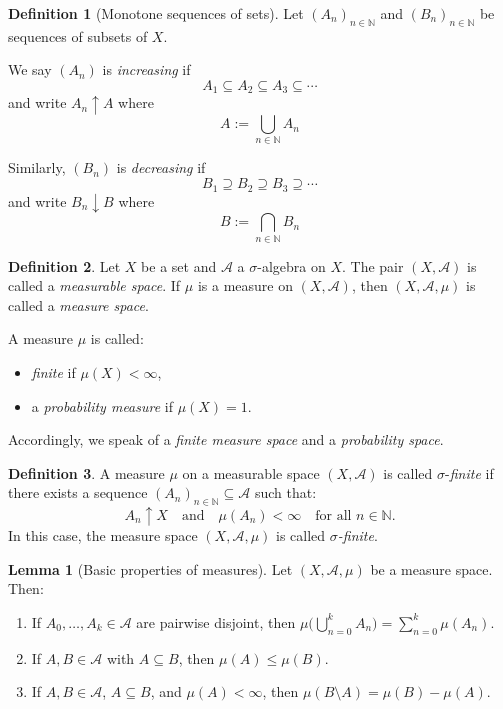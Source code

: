 \documentclass{article}
\theoremstyle{definition}
\newtheorem{definition}{Definition}[section]
\newtheorem{lemma}[theorem]{Lemma}
\begin{document}
\medskip
\begin{definition}[Monotone sequences of sets]
Let \((A_n)_{n \in \mathbb{N}}\) and \((B_n)_{n \in \mathbb{N}}\) be sequences of subsets of \(X\).

We say \((A_n)\) is \emph{increasing} if 
\[
A_1 \subseteq A_2 \subseteq A_3 \subseteq \cdots
\]
and write \(A_n \uparrow A\) where
\[
A := \bigcup_{n \in \mathbb{N}} A_n
\]

Similarly, \((B_n)\) is \emph{decreasing} if
\[
B_1 \supseteq B_2 \supseteq B_3 \supseteq \cdots
\]
and write \(B_n \downarrow B\) where
\[
B := \bigcap_{n \in \mathbb{N}} B_n
\]
\end{definition}


\medskip
\begin{definition}
Let \(X\) be a set and \(\mathcal{A}\) a \(\sigma\)-algebra on \(X\). The pair \((X, \mathcal{A})\) is called a \emph{measurable space}.  
If \(\mu\) is a measure on \((X, \mathcal{A})\), then \((X, \mathcal{A}, \mu)\) is called a \emph{measure space}.

\medskip

A measure \(\mu\) is called:
\begin{itemize}
  \item \emph{finite} if \(\mu(X) < \infty\),
  \item a \emph{probability measure} if \(\mu(X) = 1\).
\end{itemize}

Accordingly, we speak of a \emph{finite measure space} and a \emph{probability space}.
\end{definition}


\medskip
\begin{definition}
A measure \(\mu\) on a measurable space \((X, \mathcal{A})\) is called \(\sigma\)-\emph{finite} if there exists a sequence \((A_n)_{n \in \mathbb{N}} \subseteq \mathcal{A}\) such that:
\[
A_n \uparrow X \quad \text{and} \quad \mu(A_n) < \infty \quad \text{for all } n \in \mathbb{N}.
\]
In this case, the measure space \((X, \mathcal{A}, \mu)\) is called \emph{\(\sigma\)-finite}.
\end{definition}


\medskip
\begin{lemma}[Basic properties of measures]
Let \((X,\mathcal{A},\mu)\) be a measure space. Then:
\renewcommand{\labelenumi}{(\roman{enumi})}
\begin{enumerate}
    \item If \(A_0, \ldots, A_k \in \mathcal{A}\) are pairwise disjoint, then \(\mu\big(\bigcup_{n=0}^k A_n\big) = \sum_{n=0}^k \mu(A_n)\).
    \item If \(A, B \in \mathcal{A}\) with \(A \subseteq B\), then \(\mu(A) \leq \mu(B)\).
    \item If \(A, B \in \mathcal{A}\), \(A \subseteq B\), and \(\mu(A) < \infty\), then \(\mu(B \setminus A) = \mu(B) - \mu(A)\).
\end{enumerate}
\end{lemma}
\end{document}
